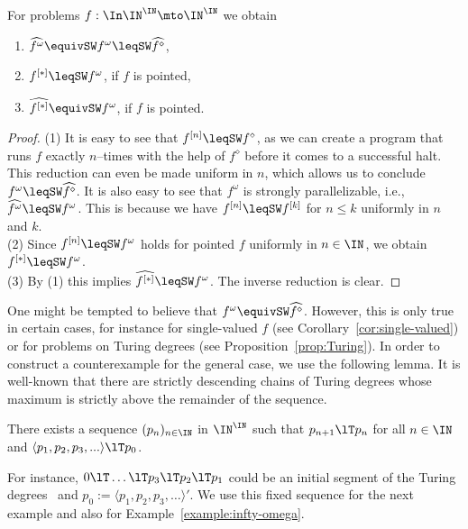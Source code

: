 \documentclass{lmcs}
\begin{document}
\begin{prop}
\label{prop:omega}
For problems $f:\In\IN^\IN\mto\IN^\IN$ we obtain
\begin{enumerate}
\item $\widehat{f^\omega}\equivSW f^\omega\leqSW\widehat{f^\diamond}$,
\item $f^{[*]}\leqSW f^\omega$, if $f$ is pointed,
\item $\widehat{f^{[*]}}\equivSW f^\omega$, if $f$ is pointed.
\end{enumerate}
\end{prop}
\begin{proof}
(1) It is easy to see that $f^{[n]}\leqSW f^\diamond$, as we can create a program that runs $f$ exactly $n$--times with the help of $f^\diamond$ before it comes to a successful halt.
This reduction can even be made uniform in $n$, which allows us to conclude $f^\omega\leqSW\widehat{f^\diamond}$.
It is also easy to see that $f^\omega$ is strongly parallelizable, i.e., $\widehat{f^\omega}\leqSW f^\omega$. 
This is because we have $f^{[n]}\leqSW f^{[k]}$ for $n\leq k$ uniformly in $n$ and $k$.\\
(2) Since $f^{[n]}\leqSW f^\omega$ holds for pointed $f$ uniformly in $n\in\IN$, we obtain $f^{[*]}\leqSW f^\omega$.\\
(3) By (1) this implies $\widehat{f^{[*]}}\leqSW f^\omega$. The inverse reduction is clear.
\end{proof}

\noindent
One might be tempted to believe that $f^\omega\equivSW\widehat{f^\diamond}$. However, this is only true in certain cases,
for instance for single-valued $f$ (see Corollary~\ref{cor:single-valued}) or for problems on Turing degrees (see Proposition~\ref{prop:Turing}).
In order to construct a counterexample for the general case, we use the following lemma.
It is well-known that there are strictly descending chains of Turing degrees whose maximum is strictly above the remainder of the sequence.

\begin{lem}
\label{lem:Turing}
There exists a sequence $(p_n)_{n\in\IN}$ in $\IN^\IN$ such that 
$p_{n+1}\lT p_n$ for all $n\in\IN$ and $\langle p_1,p_2,p_3,...\rangle\lT p_0$.
\end{lem}

\noindent
For instance, $0\lT \dots\lT p_3\lT p_2\lT p_1$ could be an initial
segment of the Turing degrees~\cite{Hug69} and
$p_0:=\langle p_1,p_2,p_3,\dots\rangle'$.
We use this fixed sequence for the next example and also for Example~\ref{example:infty-omega}.
\end{document}
